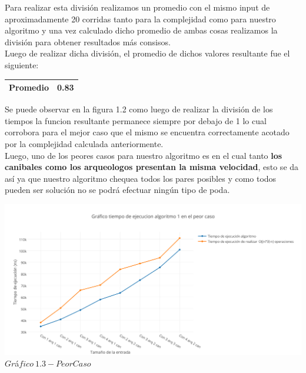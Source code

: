  Para realizar esta divisi\'on realizamos un promedio con el mismo input de aproximadamente 20 corridas tanto para la complejidad como para nuestro algoritmo y una vez calculado dicho promedio de ambas cosas realizamos la divisi\'on para
obtener resultados m\'as consisos.\\ 

Luego de realizar dicha divisi\'on, el promedio de dichos valores resultante fue el siguiente:

\begin{center}
\begin{table}[H]

    \begin{tabular}{ | l |l |}
    \hline

\textbf{Promedio} & 0.83 \\ \hline

    \end{tabular}
\end{table}
\end{center}


Se puede observar en la figura 1.2 como luego de realizar la divisi\'on de los tiempos la funcion resultante permanece siempre por debajo de 1 lo cual corrobora para el mejor caso que el mismo se encuentra correctamente acotado por la complejidad calculada anteriormente.\\

Luego, uno de los peores casos para nuestro algoritmo es en el cual tanto \textbf{los canibales como los arqueologos presentan la misma velocidad}, esto se da as\'i ya que nuestro algoritmo chequea todos los pares posibles y como todos pueden ser soluci\'on no se podr\'a efectuar ning\'un tipo de poda.\\


\vspace*{0.3cm} \vspace*{0.3cm}
  \begin{center}
\includegraphics[scale=0.6]{./EJ1/peorcasoej1.png}
{$Gr$\'a$fico \ 1.3 - Peor Caso$}
  \end{center}
  \vspace*{0.3cm}

